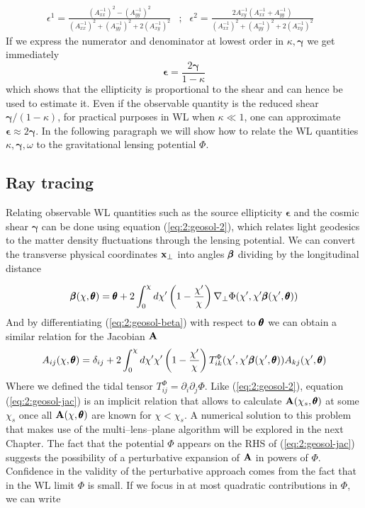 \begin{equation}
\label{eq:2:ellipticity-2}
\begin{matrix}
\epsilon^1 = \frac{(A^{-1}_{xx})^2-(A^{-1}_{yy})^2}{(A^{-1}_{xx})^2+(A^{-1}_{yy})^2+2(A^{-1}_{xy})^2} & ; & \epsilon^2 = \frac{2A^{-1}_{xy}(A^{-1}_{xx}+A^{-1}_{yy})}{(A^{-1}_{xx})^2+(A^{-1}_{yy})^2+2(A^{-1}_{xy})^2} &
\end{matrix}
\end{equation}
%
If we express the numerator and denominator at lowest order in $\kappa,\pmb{\gamma}$ we get immediately
\begin{equation}
\label{eq:2:ellipticity-3}
\pmb{\epsilon} = \frac{2\pmb{\gamma}}{1-\kappa}
\end{equation}
%
which shows that the ellipticity is proportional to the shear and can hence be used to estimate it. Even if the observable quantity is the reduced shear $\pmb{\gamma}/(1-\kappa)$, for practical purposes in WL when $\kappa\ll 1$, one can approximate $\pmb{\epsilon}\approx 2\pmb{\gamma}$. In the following paragraph we will show how to relate the WL quantities $\kappa,\pmb{\gamma},\omega$ to the gravitational lensing potential $\Phi$. 

\subsection{Ray tracing}
Relating observable WL quantities such as the source ellipticity $\pmb{\epsilon}$ and the cosmic shear $\pmb{\gamma}$ can be done using equation (\ref{eq:2:geosol-2}), which relates light geodesics to the matter density fluctuations through the lensing potential. We can convert the transverse physical coordinates $\mathbf{x}_\perp$ into angles $\pmb{\beta}$ dividing by the longitudinal distance

\begin{equation}
\label{eq:2:geosol-beta}
\pmb{\beta}(\chi,\pmb{\theta}) = \pmb{\theta} + 2\int_0^\chi d\chi'\left(1-\frac{\chi'}{\chi}\right)\nabla_\perp\Phi(\chi',\chi'\pmb{\beta}(\chi',\pmb{\theta}))
\end{equation}
%
And by differentiating (\ref{eq:2:geosol-beta}) with respect to $\pmb{\theta}$ we can obtain a similar relation for the Jacobian $\mathbf{A}$
\begin{equation}
\label{eq:2:geosol-jac}
A_{ij}(\chi,\pmb{\theta}) = \delta_{ij} + 2\int_0^\chi d\chi'\chi'\left(1-\frac{\chi'}{\chi}\right)T^{\Phi}_{ik}(\chi',\chi'\pmb{\beta}(\chi',\pmb{\theta}))A_{kj}(\chi',\pmb{\theta})
\end{equation}
%
Where we defined the tidal tensor $T^{\Phi}_{ij}=\partial_i\partial_j\Phi$. Like (\ref{eq:2:geosol-2}), equation (\ref{eq:2:geosol-jac}) is an implicit relation that allows to calculate $\mathbf{A}(\chi_s,\pmb{\theta})$ at some $\chi_s$ once all $\mathbf{A}(\chi,\pmb{\theta})$ are known for $\chi<\chi_s$. A numerical solution to this problem that makes use of the multi--lens--plane algorithm \citep{RayTracingJain,RayTracingHartlap} will be explored in the next Chapter. 
The fact that the potential $\Phi$ appears on the RHS of (\ref{eq:2:geosol-jac}) suggests the possibility of a perturbative expansion of $\mathbf{A}$ in powers of $\Phi$. Confidence in the validity of the perturbative approach comes from the fact that in the WL limit $\Phi$ is small. If we focus in at most quadratic contributions in $\Phi$, we can write

